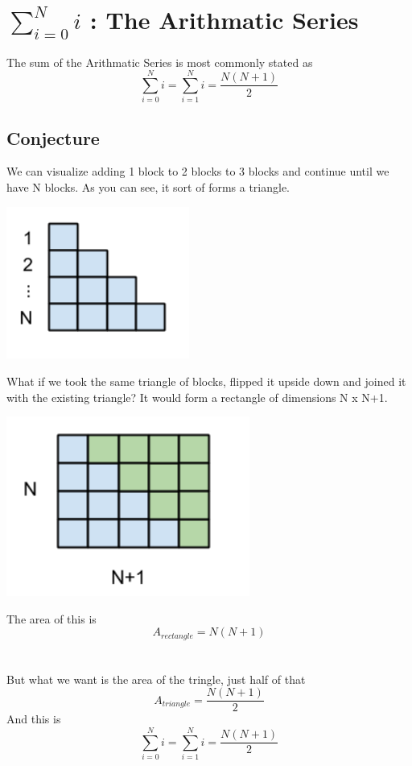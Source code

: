 \section{$\sum\limits_{i=0}^N{i}$ : The Arithmatic Series}
The sum of the Arithmatic Series is most commonly stated as
\[\sum_{i=0}^N i= \sum_{i=1}^N i = \frac{N(N+1)}{2} \]

\subsection{Conjecture}
We can visualize adding 1 block to 2 blocks to 3 blocks and continue until we have N blocks.  As you can see, it sort of forms a triangle. \\
\begin{center}
\includegraphics[width=6cm]{Summations/sum_i_diag1}
\end{center}
What if we took the same triangle of blocks, flipped it upside down and joined it with the existing triangle?  It would form a rectangle of dimensions N x N+1. \\
\begin{center}
\includegraphics[width=8cm]{Summations/sum_i_diag2}
\end{center}
The area of this is \[A_{rectangle} = N(N+1)\] \\
\\
But what we want is the area of the tringle, just half of that \[A_{triangle}=\frac{N(N+1)}{2}\]
And this is \[ \sum_{i=0}^N i= \sum_{i=1}^N i = \frac{N(N+1)}{2}\]


